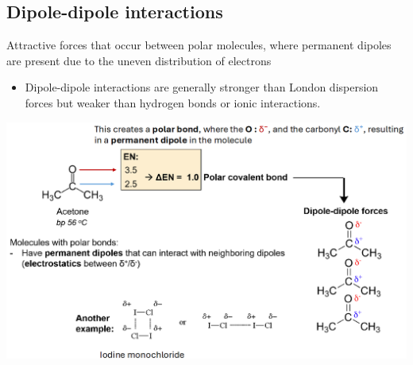 \documentclass[10pt]{article}
\begin{document}
\subsection*{Dipole-dipole interactions}
Attractive forces that occur between polar molecules, where permanent dipoles are present due to the uneven distribution of electrons
\begin{itemize}
    \item Dipole-dipole interactions are generally stronger than London dispersion forces but weaker than hydrogen bonds or ionic interactions.
\end{itemize}
\begin{center}
    \includegraphics[width=\textwidth]{L3_4.png}
\end{center}
\end{document}
